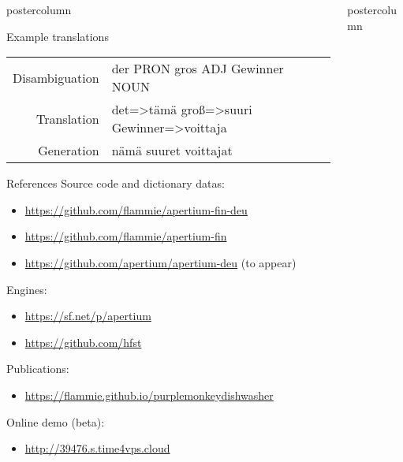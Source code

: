 \documentclass[final,hyperref={pdfpagelabels}]{beamer}
\newlength{\columnheight}
\begin{document}
\begin{frame}
\begin{columns}
\begin{column}{.49\textwidth}
\begin{beamercolorbox}[center,wd=\textwidth]{postercolumn}
\begin{minipage}[T]{.95\textwidth}
{\begin{block}{Example translations}
\begin{tabular}{|r|l|}
                Disambiguation &  der PRON gros ADJ Gewinner NOUN\\
                Translation & det=>tämä groß=>suuri Gewinner=>voittaja \\
                Generation & nämä suuret voittajat \\
                \hline
            \end{tabular}
        \end{block}

        \begin{block}{References}
            Source code and dictionary datas:
            \begin{itemize}
                \item \url{https://github.com/flammie/apertium-fin-deu}
                \item \url{https://github.com/flammie/apertium-fin}
                \item \url{https://github.com/apertium/apertium-deu} (to appear)
            \end{itemize}
            Engines:
            \begin{itemize}
                \item \url{https://sf.net/p/apertium}
                \item \url{https://github.com/hfst}
            \end{itemize}
            Publications:
            \begin{itemize}
                \item \url{https://flammie.github.io/purplemonkeydishwasher}
            \end{itemize}
            Online demo (beta):
            \begin{itemize}
                \item \url{http://39476.s.time4vps.cloud}
            \end{itemize}
        \end{block}

         }
        \end{minipage}
      \end{beamercolorbox}
  \end{column}

   \begin{column}{.49\textwidth}
      \begin{beamercolorbox}[center,wd=\textwidth]{postercolumn}
        \begin{minipage}[T]{.95\textwidth} %
          \parbox[t][\columnheight]{\textwidth}{ %

}
\end{minipage}
\end{beamercolorbox}
\end{column}
\end{columns}
\end{frame}
\end{document}
